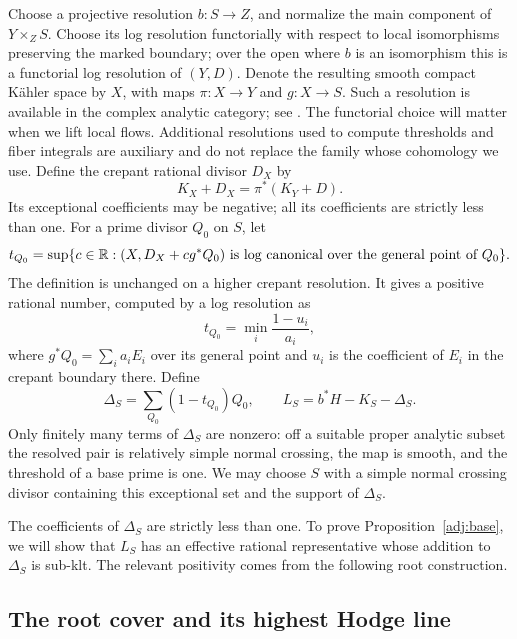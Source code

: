 Choose a projective resolution $b:S\to Z$, and normalize the main
component of $Y\times_Z S$.  Choose its log resolution functorially
with respect to local isomorphisms preserving the marked boundary;
over the open where $b$ is an isomorphism this is a functorial log
resolution of $(Y,D)$.  Denote the resulting smooth compact K\"ahler
space by $X$, with maps $\pi:X\to Y$ and $g:X\to S$.
Such a resolution is available in the complex analytic category;
see \cite[Theorem~1.1 and the preceding analytic remark]{BierstoneMilman2008}.
The functorial choice will matter when we lift local flows.
Additional resolutions used to compute thresholds and fiber integrals
are auxiliary and do not replace the family whose cohomology we use.
Define the crepant rational divisor $D_X$ by
\[
              K_X+D_X=\pi^*(K_Y+D).
\]
Its exceptional coefficients may be negative; all its coefficients are
strictly less than one.  For a prime divisor $Q_0$ on $S$, let
\[
 t_{Q_0}=\sup\{c\in\mathbb R:(X,D_X+c g^*Q_0)
             \text{ is log canonical over the general point of }Q_0\}.
\]
The definition is unchanged on a higher crepant resolution.  It gives a
positive rational number, computed by a log resolution as
\begin{equation}
\label{adj:threshold}
             t_{Q_0}=\min_i\frac{1-u_i}{a_i},
\end{equation}
where $g^*Q_0=\sum_i a_i E_i$ over its general point and $u_i$ is the
coefficient of $E_i$ in the crepant boundary there.  Define
\begin{equation}
\label{adj:discriminant}
 \Delta_S=\sum_{Q_0}(1-t_{Q_0})Q_0,
 \qquad L_S=b^*H-K_S-\Delta_S.
\end{equation}
Only finitely many terms of $\Delta_S$ are nonzero: off a suitable proper
analytic subset the resolved pair is relatively simple normal crossing,
the map is smooth, and the threshold of a base prime is one.  We may choose
$S$ with a simple normal crossing divisor containing this exceptional set
and the support of $\Delta_S$.

The coefficients of $\Delta_S$ are strictly less than one.  To prove
Proposition~\ref{adj:base}, we will show that $L_S$ has an effective rational
representative whose addition to $\Delta_S$ is sub-klt.  The relevant
positivity comes from the following root construction.

\subsection{The root cover and its highest Hodge line}

